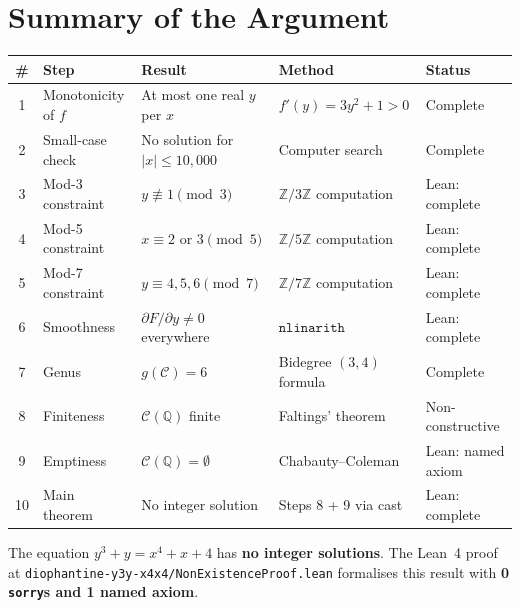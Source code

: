 \documentclass[12pt, a4paper]{article}
\theoremstyle{definition}
\newcommand{\Z}{\mathbb{Z}}
\newcommand{\Q}{\mathbb{Q}}
\begin{document}
\section{Summary of the Argument}\label{sec:summary}

\begin{center}
\renewcommand{\arraystretch}{1.3}
\begin{tabular}{cllll}
\toprule
\textbf{\#} & \textbf{Step} & \textbf{Result} & \textbf{Method} & \textbf{Status} \\
\midrule
1 & Monotonicity of $f$ & At most one real $y$ per $x$ & $f'(y) = 3y^2+1 > 0$ & Complete \\
2 & Small-case check & No solution for $|x| \leq 10{,}000$ & Computer search & Complete \\
3 & Mod-3 constraint & $y \not\equiv 1 \pmod 3$ & $\Z/3\Z$ computation & Lean: complete \\
4 & Mod-5 constraint & $x \equiv 2$ or $3 \pmod 5$ & $\Z/5\Z$ computation & Lean: complete \\
5 & Mod-7 constraint & $y \equiv 4,5,6 \pmod 7$ & $\Z/7\Z$ computation & Lean: complete \\
6 & Smoothness & $\partial F/\partial y \neq 0$ everywhere & $\mathtt{nlinarith}$ & Lean: complete \\
7 & Genus & $g(\mathcal{C}) = 6$ & Bidegree $(3,4)$ formula & Complete \\
8 & Finiteness & $\mathcal{C}(\Q)$ finite & Faltings' theorem & Non-constructive \\
9 & Emptiness & $\mathcal{C}(\Q) = \emptyset$ & Chabauty--Coleman & Lean: named axiom \\
10 & Main theorem & No integer solution & Steps 8 + 9 via cast & Lean: complete \\
\bottomrule
\end{tabular}
\end{center}

\bigskip

\begin{tcolorbox}[colback=gray!10, colframe=black!50, sharp corners, title=Final Answer]
  The equation $y^3 + y = x^4 + x + 4$ has \textbf{no integer solutions}.
  The Lean~4 proof at \texttt{diophantine-y3y-x4x4/NonExistenceProof.lean}
  formalises this result with \textbf{0 \texttt{sorry}s and 1 named axiom}.
\end{tcolorbox}
\end{document}
